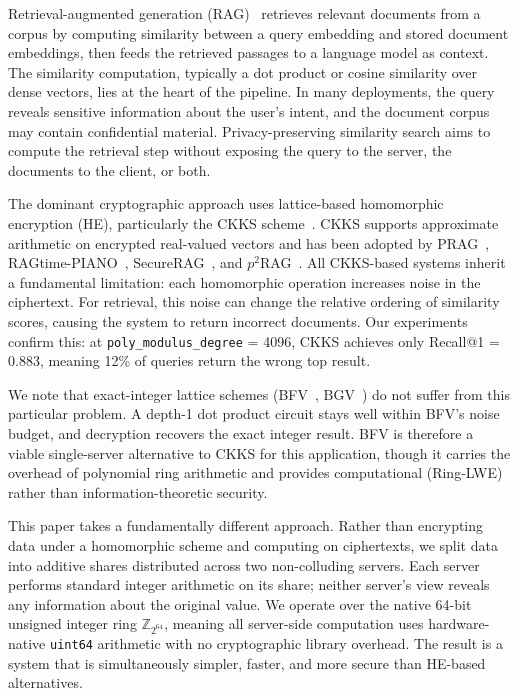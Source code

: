 \documentclass[11pt]{article}
\newcommand{\Z}{\mathbb{Z}}
\begin{document}
Retrieval-augmented generation (RAG)~\cite{lewis2020retrieval} retrieves relevant documents from a corpus by computing similarity between a query embedding and stored document embeddings, then feeds the retrieved passages to a language model as context. The similarity computation, typically a dot product or cosine similarity over dense vectors, lies at the heart of the pipeline. In many deployments, the query reveals sensitive information about the user's intent, and the document corpus may contain confidential material. Privacy-preserving similarity search aims to compute the retrieval step without exposing the query to the server, the documents to the client, or both.

The dominant cryptographic approach uses lattice-based homomorphic encryption (HE), particularly the CKKS scheme~\cite{cheon2017homomorphic}. CKKS supports approximate arithmetic on encrypted real-valued vectors and has been adopted by PRAG~\cite{prag2026}, RAGtime-PIANO~\cite{ragtimepiano2026}, SecureRAG~\cite{securerag2025}, and $p^2$RAG~\cite{p2rag2026}. All CKKS-based systems inherit a fundamental limitation: each homomorphic operation increases noise in the ciphertext. For retrieval, this noise can change the relative ordering of similarity scores, causing the system to return incorrect documents. Our experiments confirm this: at \texttt{poly\_modulus\_degree} = 4096, CKKS achieves only Recall@1 = 0.883, meaning 12\% of queries return the wrong top result.

We note that exact-integer lattice schemes (BFV~\cite{fan2012somewhat}, BGV~\cite{brakerski2014leveled}) do not suffer from this particular problem. A depth-1 dot product circuit stays well within BFV's noise budget, and decryption recovers the exact integer result. BFV is therefore a viable single-server alternative to CKKS for this application, though it carries the overhead of polynomial ring arithmetic and provides computational (Ring-LWE) rather than information-theoretic security.

This paper takes a fundamentally different approach. Rather than encrypting data under a homomorphic scheme and computing on ciphertexts, we split data into additive shares distributed across two non-colluding servers. Each server performs standard integer arithmetic on its share; neither server's view reveals any information about the original value. We operate over the native 64-bit unsigned integer ring $\Z_{2^{64}}$, meaning all server-side computation uses hardware-native \texttt{uint64} arithmetic with no cryptographic library overhead. The result is a system that is simultaneously simpler, faster, and more secure than HE-based alternatives.
\end{document}
